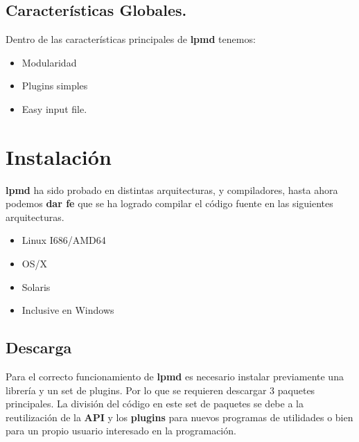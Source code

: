 \documentclass[a4paper,10pt]{scrbook}
\newcommand{\lpmd}{\textbf{lpmd }}
\begin{document}
\section{Caracter\'isticas Globales.}

Dentro de las caracter\'isticas principales de \lpmd tenemos:
\begin{itemize}
 \item Modularidad
 \item Plugins simples
 \item Easy input file.
\end{itemize}

\chapter{Instalaci\'on}
\label{chap:inst}

\lpmd ha sido probado en distintas arquitecturas, y compiladores, hasta ahora podemos \textbf{dar fe} que se ha logrado compilar el c\'odigo fuente en las siguientes arquitecturas.

\begin{itemize}
 \item Linux I686/AMD64
 \item OS/X
 \item Solaris
 \item Inclusive en Windows
\end{itemize}

\section{Descarga}

Para el correcto funcionamiento de \lpmd es necesario instalar previamente una librer\'ia y un set de plugins. Por lo que se requieren descargar 3 paquetes principales. La divisi\'on del c\'odigo en este set de paquetes se debe a la reutilizaci\'on de la \textbf{API} y los \textbf{plugins} para nuevos programas de utilidades o bien para un propio usuario interesado en la programaci\'on.
\end{document}
